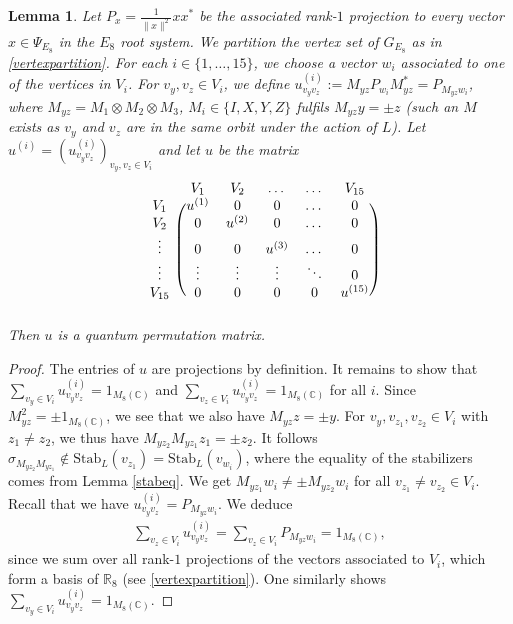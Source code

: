 \documentclass[11pt]{article}
\newtheorem{lemm}[theo]{Lemma}
\theoremstyle{definition}
\numberwithin{equation}{section}
\newcommand{\C}{\mathbb{C}}
\begin{document}
\begin{lemm}\label{qpermmatrix}
Let $P_x=\frac{1}{\|x\|^2}xx^*$ be the associated rank-$1$ projection to every vector $x \in \Psi_{E_8}$ in the $E_8$ root system. We partition the vertex set of $G_{E_8}$ as in \eqref{vertexpartition}. For each $i \in \{1,\dots, 15\}$, we choose a vector $w_i$ associated to one of the vertices in $V_i$. For $v_y, v_z \in V_i$, we define $u_{v_yv_z}^{(i)}:=M_{yz}P_{w_i}M_{yz}^*=P_{M_{yz}w_i}$, where $M_{yz}=M_1\otimes M_2 \otimes M_3$,  $M_i\in \{I,X,Y,Z\}$ fulfils $M_{yz}y=\pm z$ (such an $M$ exists as $v_y$ and $v_z$ are in the same orbit under the action of $L$). Let $u^{(i)}=(u_{v_yv_z}^{(i)})_{v_y,v_z \in V_i}$ and let $u$ be the matrix 
\begin{align}
\begin{blockarray}{cccccc}
&V_1&V_2&\dots&\dots&V_{15}\\
\begin{block}{c(ccccc)}
V_1&u^{(1)}&0&0&\dots&0\\ V_2&0&u^{(2)}&0&\dots&0\\ \vdots&0&0&u^{(3)}&\dots&0\\\vdots&\vdots &\vdots&\vdots&\ddots&0\\V_{15}&0&0&0&0&u^{(15)} \\
\end{block}
\end{blockarray}\label{blockmatrix}
\end{align}
Then $u$ is a quantum permutation matrix.
\end{lemm}

\begin{proof}
The entries of $u$ are projections by definition. It remains to show that $\sum_{v_y\in V_i}u_{v_yv_z}^{(i)}=1_{M_8(\C)}$ and $\sum_{v_z\in V_i}u_{v_yv_z}^{(i)}=1_{M_8(\C)}$ for all $i$. Since $M_{yz}^2=\pm 1_{M_8(\C)}$, we see that we also have $M_{yz}z=\pm y$. For $v_y, v_{z_1}, v_{z_2}\in V_i$ with $z_1\neq z_2$, we thus have $M_{yz_2}M_{yz_1}z_1=\pm z_2$. It follows $\sigma_{M_{yz_2}M_{yz_1}}\notin \mathrm{Stab}_L(v_{z_1})=\mathrm{Stab}_L(v_{w_i})$, where the equality of the stabilizers comes from Lemma \ref{stabeq}. We get $M_{yz_1}w_i\neq \pm M_{yz_2}w_i$ for all $v_{z_1}\neq v_{z_2} \in V_i$. Recall that we have $u_{v_yv_z}^{(i)}=P_{M_{yz}w_i}$. We deduce
\begin{align*}
    \sum_{v_z\in V_i}u_{v_yv_z}^{(i)}=\sum_{v_z\in V_i}P_{M_{yz}w_i}=1_{M_8(\C)},
\end{align*}
since we sum over all rank-$1$ projections of the vectors associated to $V_i$, which form a basis of $\mathbb{R}_8$ (see \eqref{vertexpartition}). One similarly shows $\sum_{v_y\in V_i}u_{v_yv_z}^{(i)}=1_{M_8(\C)}$.
\end{proof}
\end{document}
